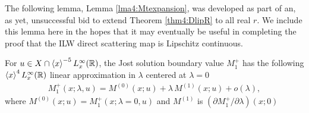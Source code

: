 \documentclass[../dissertation.tex]{subfiles}
\begin{document}
The following lemma, Lemma \ref{lma4:Mtexpansion}, was developed as part of an, as 
yet, unsuccessful bid to 
extend Theorem \ref{thm4:DlipR} to all real $r$. We include this lemma here in the 
hopes that it may eventually be useful in completing the proof that the ILW 
direct scattering map is Lipschitz continuous. 

\begin{lma}\label{lma4:Mtexpansion}
	For $u \in X\cap \left\langle x \right\rangle^{-5} L_x^\infty(\mathbb R)$, the Jost solution 
	boundary value
	$M_1^+$ has the following $\left\langle x \right\rangle^4L_x^\infty(\mathbb R)$
	linear approximation in $\lambda$ centered at $\lambda = 0$
	\begin{align}
		M_1^+(x; \lambda, u) 
			= M^{(0)}(x; u) + \lambda \, M^{(1)}(x; u) + o(\lambda),
	\end{align}
	where $M^{(0)}(x; u) = M_1^+(x; \lambda = 0, u)$ and
	$M^{(1)}$ is $(\partial M_1^+ / \partial \lambda)(x; 0)$
\end{lma}
\end{document}

